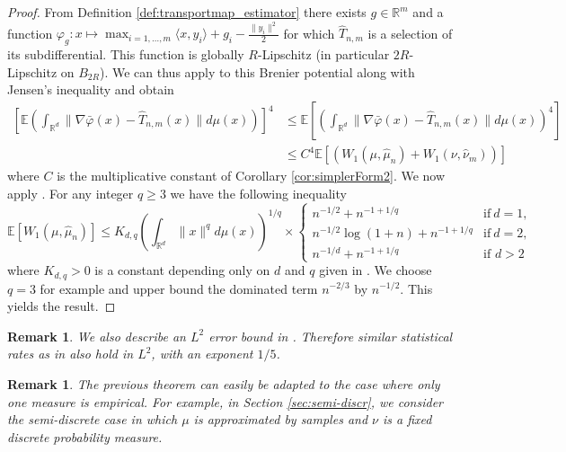 \documentclass[11pt]{article}
\newtheorem{remark}[lemma]{Remark}
\newcommand{\R}{\mathbb R}
\newcommand{\1}{\mathbbm{1}}
\numberwithin{equation}{section}
\begin{document}
\begin{proof}
    From Definition \ref{def:transportmap_estimator} there exists $g\in \R^m$ and a function $\varphi_g:x\mapsto\max_{i=1,\ldots,m}\langle x,y_i \rangle+g_i-\frac{\|y_i\|^2}{2}$ for which $\hat{T}_{n,m}$ is a selection of its subdifferential.  This function is globally $R$-Lipschitz (in particular $2R$-Lipschitz on $B_{2R}$). We can thus apply  to this Brenier potential along with Jensen's inequality  and obtain 
    \begin{align*}
        \left[\mathbb{E} \left(\int_{\R^d}\|\nabla \bar{\varphi}(x)-\hat{T}_{n,m}(x)\|d\mu(x)\right)
        \right]^4&\leq \mathbb{E}\left[ \left(\int_{\R^d}\|\nabla \bar{\varphi}(x)-\hat{T}_{n,m}(x)\|d\mu(x)\right)^4\right] \\
        &\leq C^4\mathbb{E}\left[\left(W_1(\mu,\hat{\mu}_n) + W_1 (\nu, \hat{\nu}_m)\right)\right]
    \end{align*}
    where $C$ is the multiplicative constant of Corollary \ref{cor:simplerForm2}.
    We now apply \cite[Main Theorem]{fournier2015rate}. For any integer $q\geq 3$ we have the following inequality 
    \begin{equation*}
        \mathbb{E}\left[W_1(\mu,\hat{\mu}_n)\right] \leq K_{d,q}\left(\int_{\R^d}\|x\|^qd\mu(x)\right)^{1/q}\times
            \begin{cases}
            n^{-1/2}+n^{-1+1/q}& \text{if}\: d=1 ,\\
            n^{-1/2}\log(1+n)+n^{-1+1/q} & \text{if}\: d=2,\\
            n^{-1/d} +n^{-1+1/q} & \text{if } d > 2
        \end{cases}
    \end{equation*}
    where $K_{d,q}>0$ is a constant depending only on $d$ and $q$ given in \cite{fournier2015rate}. We choose $q=3$ for example and upper bound the dominated term $n^{-2/3}$ by $n^{-1/2}$. This yields the result.
    
\end{proof}

\begin{remark}
    We also describe an $L^2$ error bound in . Therefore similar statistical rates as in  also hold in $L^2$, with an exponent $1/5$.
\end{remark}

\begin{remark}
    The previous theorem can easily be adapted to the case where only one measure is empirical. For example, in Section \ref{sec:semi-discr}, we consider the semi-discrete case in which $\mu$ is approximated by samples and $\nu$ is a fixed discrete probability measure.
\end{remark}
\end{document}
